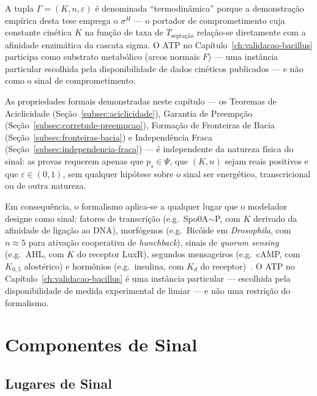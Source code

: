 \begin{remark}
\label{rem:gamma-generalidade}
A tupla $\Gamma = (K, n, \varepsilon)$ é denominada ``termodinâmica'' porque
a demonstração empírica desta tese emprega o $\sigma^H$ --- o portador de
comprometimento cuja constante cinética $K$ na função de taxa de $T_{\text{septação}}$
relação-se diretamente com a afinidade enzimática da cascata sigma. O ATP
no Capítulo~\ref{ch:validacao-bacillus} participa como substrato metabólico
(arcos normais $F$) --- uma instância particular escolhida pela disponibilidade de
dados cinéticos publicados --- e não como o sinal de comprometimento.

As propriedades formais demonstradas neste capítulo --- os Teoremas de Aciclicidade
(Seção~\ref{subsec:aciclicidade}), Garantia de Preempção
(Seção~\ref{subsec:corretude-preempcao}), Formação de Fronteiras de Bacia
(Seção~\ref{subsec:fronteiras-bacia}) e Independência Fraca
(Seção~\ref{subsec:independencia-fraca}) --- é independente da natureza
física do sinal: as provas requerem apenas que $p_s \in \Psi$, que $(K, n)$
sejam reais positivos e que $\varepsilon \in (0,1)$, sem qualquer hipótese
sobre o sinal ser energético, transcricional ou de outra natureza.

Em consequência, o formalismo aplica-se a qualquer lugar que o modelador
designe como sinal: fatores de transcrição (e.g.\ Spo0A${\sim}$P, com $K$
derivado da afinidade de ligação ao DNA), morfógenos (e.g.\ Bicóide em
\textit{Drosophila}, com $n \approx 5$ para ativação cooperativa de
\textit{hunchback}), sinais de \textit{quorum sensing} (e.g.\ AHL, com $K$ do
receptor LuxR), segundos mensageiros (e.g.\ cAMP, com $K_{0{,}5}$
alostérico) e hormônios (e.g.\ insulina, com $K_d$ do receptor)~\cite{Simao2026QuorumSensing}.  O ATP
no Capítulo~\ref{ch:validacao-bacillus} é uma instância particular ---
escolhida pela disponibilidade de medida experimental de limiar --- e não uma
restrição do formalismo.
\end{remark}

\section{Componentes de Sinal}
\label{sec:componentes-sinal}

\subsection{Lugares de Sinal}
\label{subsec:lugares-sinal}

